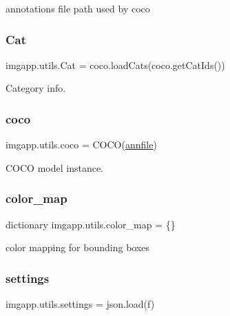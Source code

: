 annotations file path used by coco 

\mbox{\label{namespaceimgapp_1_1utils_a76721855ae19d74f938f4a234ccf2fa4}} 
\subsubsection{\texorpdfstring{Cat}{Cat}}
{\footnotesize\ttfamily imgapp.\+utils.\+Cat = coco.\+load\+Cats(coco.\+get\+Cat\+Ids())}



Category info. 

\mbox{\label{namespaceimgapp_1_1utils_a019aef0229f11d0fce25f09543158b1d}} 
\subsubsection{\texorpdfstring{coco}{coco}}
{\footnotesize\ttfamily imgapp.\+utils.\+coco = C\+O\+CO(\hyperlink{namespaceimgapp_1_1utils_a8e182872d7fd166b733945c31c6e75b0}{annfile})}



C\+O\+CO model instance. 

\mbox{\label{namespaceimgapp_1_1utils_aef6c0a613ef435057531c3e15d7ee228}} 
\subsubsection{\texorpdfstring{color\+\_\+map}{color\_map}}
{\footnotesize\ttfamily dictionary imgapp.\+utils.\+color\+\_\+map = \{\}}



color mapping for bounding boxes 

\mbox{\label{namespaceimgapp_1_1utils_ab8f7f09b0a834029cdce936a10744e75}} 
\subsubsection{\texorpdfstring{settings}{settings}}
{\footnotesize\ttfamily imgapp.\+utils.\+settings = json.\+load(f)}

